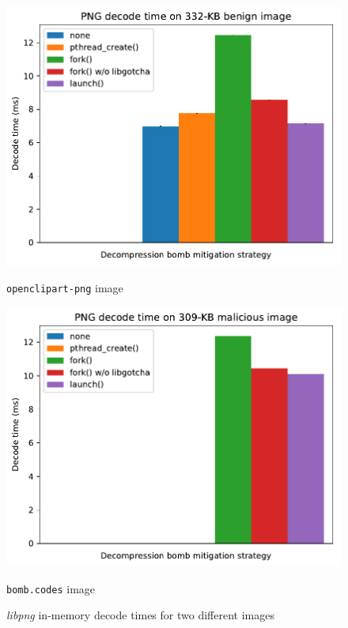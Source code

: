 \begin{figure}
	\begin{minipage}{\columnwidth}
	\includegraphics[width=\textwidth]{figs/cerberus_nns16_surplus256k_mirjam}
	\caption{\texttt{openclipart-png} image}
	\label{fig:libpng:benign}
	\end{minipage}
%
	\begin{minipage}{\columnwidth}
	\includegraphics[width=\textwidth]{figs/cerberus_nns16_surplus256k_10K}
	\caption{\texttt{bomb.codes} image}
	\label{fig:libpng:bomb}
	\end{minipage}
\caption{\textit{libpng} in-memory decode times for two different images}
\end{figure}

